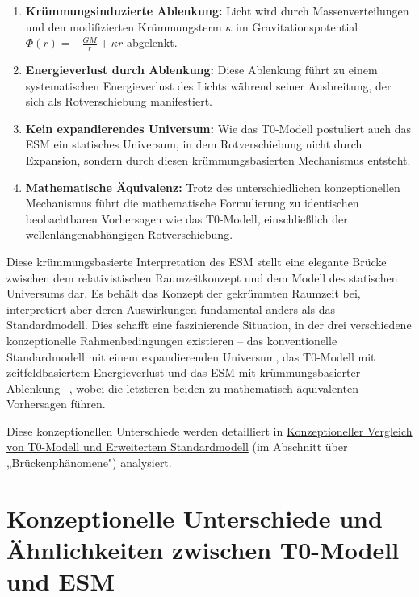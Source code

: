 \documentclass[12pt,a4paper]{article}
\begin{document}
	\begin{enumerate}
		\item \textbf{Krümmungsinduzierte Ablenkung:} Licht wird durch Massenverteilungen und den modifizierten Krümmungsterm $\kappa$ im Gravitationspotential $\Phi(r) = -\frac{GM}{r} + \kappa r$ abgelenkt.
		
		\item \textbf{Energieverlust durch Ablenkung:} Diese Ablenkung führt zu einem systematischen Energieverlust des Lichts während seiner Ausbreitung, der sich als Rotverschiebung manifestiert.
		
		\item \textbf{Kein expandierendes Universum:} Wie das T0-Modell postuliert auch das ESM ein statisches Universum, in dem Rotverschiebung nicht durch Expansion, sondern durch diesen krümmungsbasierten Mechanismus entsteht.
		
		\item \textbf{Mathematische Äquivalenz:} Trotz des unterschiedlichen konzeptionellen Mechanismus führt die mathematische Formulierung zu identischen beobachtbaren Vorhersagen wie das T0-Modell, einschließlich der wellenlängenabhängigen Rotverschiebung.
	\end{enumerate}
	
	Diese krümmungsbasierte Interpretation des ESM stellt eine elegante Brücke zwischen dem relativistischen Raumzeitkonzept und dem Modell des statischen Universums dar. Es behält das Konzept der gekrümmten Raumzeit bei, interpretiert aber deren Auswirkungen fundamental anders als das Standardmodell. Dies schafft eine faszinierende Situation, in der drei verschiedene konzeptionelle Rahmenbedingungen existieren – das konventionelle Standardmodell mit einem expandierenden Universum, das T0-Modell mit zeitfeldbasiertem Energieverlust und das ESM mit krümmungsbasierter Ablenkung –, wobei die letzteren beiden zu mathematisch äquivalenten Vorhersagen führen.
	
	Diese konzeptionellen Unterschiede werden detailliert in \href{https://github.com/jpascher/T0-Time-Mass-Duality/tree/main/2/pdf/English/T0vsESM_ConceptualAnalysisEn.pdf}{Konzeptioneller Vergleich von T0-Modell und Erweitertem Standardmodell} (im Abschnitt über „Brückenphänomene") analysiert.
	
	\section{Konzeptionelle Unterschiede und Ähnlichkeiten zwischen T0-Modell und ESM}
	\label{sec:conceptual_differences}
	
\end{document}
